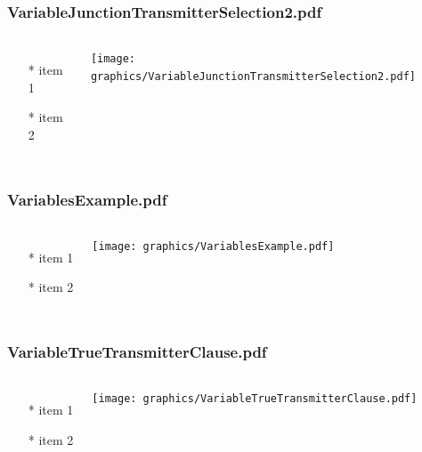 \begin{frame} \frametitle{VariableJunctionTransmitterSelection2.pdf}
    \begin{columns}[c]
        \begin{itemize}
            \item[*] item 1
            \item[*] item 2
        \end{itemize}
        \begin{minipage}{\linewidth}
            \begin{center}
            \texttt{[image: graphics/VariableJunctionTransmitterSelection2.pdf]}
            \label{gfx:VariableJunctionTransmitterSelection2.pdf}
            \end{center}
        \end{minipage}
    \end{columns}
\end{frame}
\begin{frame} \frametitle{VariablesExample.pdf}
    \begin{columns}[c]
        \begin{itemize}
            \item[*] item 1
            \item[*] item 2
        \end{itemize}
        \begin{minipage}{\linewidth}
            \begin{center}
            \texttt{[image: graphics/VariablesExample.pdf]}
            \label{gfx:VariablesExample.pdf}
            \end{center}
        \end{minipage}
    \end{columns}
\end{frame}
\begin{frame} \frametitle{VariableTrueTransmitterClause.pdf}
    \begin{columns}[c]
        \begin{itemize}
            \item[*] item 1
            \item[*] item 2
        \end{itemize}
        \begin{minipage}{\linewidth}
            \begin{center}
            \texttt{[image: graphics/VariableTrueTransmitterClause.pdf]}
            \label{gfx:VariableTrueTransmitterClause.pdf}
            \end{center}
        \end{minipage}
    \end{columns}
\end{frame}
